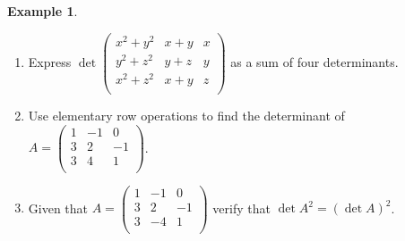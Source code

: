\documentclass[11pt,a4paper]{article}
\theoremstyle{definition}
\newtheorem{exa}[thm]{Example}
\begin{document}
\begin{exa}
\begin{enumerate}
\item Express $\det 
\begin{pmatrix}
x^2+y^2&x+y&x\\y^2+z^2&y+z&y\\x^2+z^2&x+y&z\\
\end{pmatrix}
$ as a sum of four determinants.
\item Use elementary row operations to find the determinant of $A=
\begin{pmatrix}
1&-1&0\\3&2&-1\\3&4&1\\
\end{pmatrix}
$.
\item Given that $A=
\begin{pmatrix}
1&-1&0\\3&2&-1\\3&-4&1\\
\end{pmatrix}
$ verify that $\det A^2=(\det A)^2$.
\end{enumerate}
\end{exa}
\end{document}
